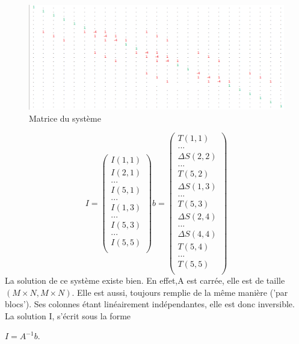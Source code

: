 \begin{figure}[!htb]
\includegraphics[scale=0.5]{Images/matrice.png}
\caption{Matrice du système}
\end{figure}
\begin{equation}
I = 
\begin{pmatrix}
I(1,1)\\
I(2,1)\\
...\\
I(5,1)\\
...\\
I(1,3)\\
...\\
I(5,3)\\
...\\
I(5,5)\\
\end{pmatrix}
b = 
\begin{pmatrix}
T(1,1)\\
...\\
\Delta S(2,2)\\
...\\
T(5,2)\\
\Delta S(1,3)\\
...\\
T(5,3)\\
\Delta S(2,4)\\
...\\
\Delta S(4,4)\\
T(5,4)\\
...\\
T(5,5)\\
\end{pmatrix}
\end{equation}
La solution de ce système existe bien. En effet,A est carrée, elle est de taille $\left(M\times N, M \times N\right)$. Elle est aussi, toujours remplie de la même manière ('par blocs'). Ses colonnes étant linéairement indépendantes, elle est donc inversible.\\
La solution I, s'écrit sous la forme
\begin{center}
$I = A^{-1}b$.
\end{center} 

